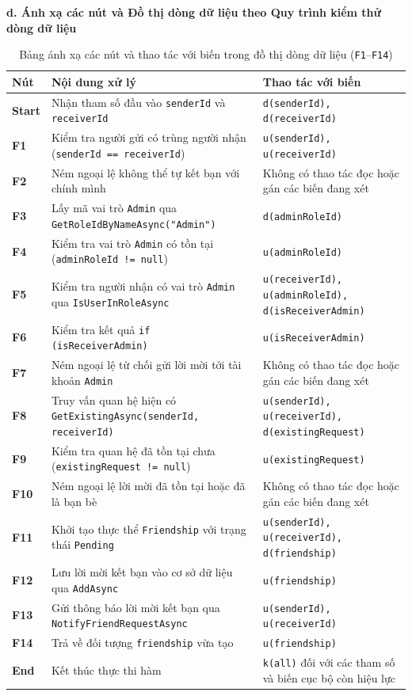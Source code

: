 \documentclass[11pt,a4paper]{article}
\begin{document}
\noindent\textbf{d. Ánh xạ các nút và Đồ thị dòng dữ liệu theo Quy trình kiểm thử dòng dữ liệu}

\begin{table}[H]
\centering
\scriptsize
\begin{tabularx}{\textwidth}{|C{1.3cm}|X|L{5.5cm}|}
\hline
{}
\textbf{Nút} & \textbf{Nội dung xử lý} & \textbf{Thao tác với biến} \tabularnewline
\hline
\textbf{Start} & Nhận tham số đầu vào \texttt{senderId} và \texttt{receiverId} & \texttt{d(senderId), d(receiverId)} \\ \hline
\textbf{F1} & Kiểm tra người gửi có trùng người nhận (\texttt{senderId == receiverId}) & \texttt{u(senderId), u(receiverId)} \\ \hline
\textbf{F2} & Ném ngoại lệ không thể tự kết bạn với chính mình & Không có thao tác đọc hoặc gán các biến đang xét \\ \hline
\textbf{F3} & Lấy mã vai trò \texttt{Admin} qua \texttt{GetRoleIdByNameAsync("Admin")} & \texttt{d(adminRoleId)} \\ \hline
\textbf{F4} & Kiểm tra vai trò \texttt{Admin} có tồn tại (\texttt{adminRoleId != null}) & \texttt{u(adminRoleId)} \\ \hline
\textbf{F5} & Kiểm tra người nhận có vai trò \texttt{Admin} qua \texttt{IsUserInRoleAsync} & \texttt{u(receiverId), u(adminRoleId), d(isReceiverAdmin)} \\ \hline
\textbf{F6} & Kiểm tra kết quả \texttt{if (isReceiverAdmin)} & \texttt{u(isReceiverAdmin)} \\ \hline
\textbf{F7} & Ném ngoại lệ từ chối gửi lời mời tới tài khoản \texttt{Admin} & Không có thao tác đọc hoặc gán các biến đang xét \\ \hline
\textbf{F8} & Truy vấn quan hệ hiện có \texttt{GetExistingAsync(senderId, receiverId)} & \texttt{u(senderId), u(receiverId), d(existingRequest)} \\ \hline
\textbf{F9} & Kiểm tra quan hệ đã tồn tại chưa (\texttt{existingRequest != null}) & \texttt{u(existingRequest)} \\ \hline
\textbf{F10} & Ném ngoại lệ lời mời đã tồn tại hoặc đã là bạn bè & Không có thao tác đọc hoặc gán các biến đang xét \\ \hline
\textbf{F11} & Khởi tạo thực thể \texttt{Friendship} với trạng thái \texttt{Pending} & \texttt{u(senderId), u(receiverId), d(friendship)} \\ \hline
\textbf{F12} & Lưu lời mời kết bạn vào cơ sở dữ liệu qua \texttt{AddAsync} & \texttt{u(friendship)} \\ \hline
\textbf{F13} & Gửi thông báo lời mời kết bạn qua \texttt{NotifyFriendRequestAsync} & \texttt{u(senderId), u(receiverId)} \\ \hline
\textbf{F14} & Trả về đối tượng \texttt{friendship} vừa tạo & \texttt{u(friendship)} \\ \hline
\textbf{End} & Kết thúc thực thi hàm & \texttt{k(all)} đối với các tham số và biến cục bộ còn hiệu lực \\ \hline
\end{tabularx}
\caption{Bảng ánh xạ các nút và thao tác với biến trong đồ thị dòng dữ liệu (\texttt{F1}--\texttt{F14})}
\end{table}
\end{document}

